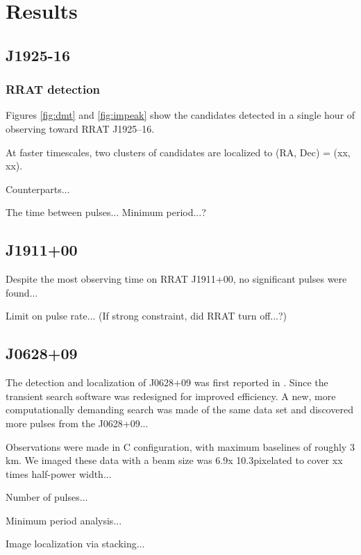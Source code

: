\section{Results}\begin{quote}

\end{quote}

\subsection{J1925-16}
\subsubsection{RRAT detection}
\label{rrat1925}

Figures \ref{fig:dmt} and \ref{fig:impeak} show the candidates detected in a single hour of observing toward RRAT J1925--16. 

At faster timescales, two clusters of candidates are localized to (RA, Dec) = (xx, xx). 

Counterparts...

The time between pulses... Minimum period...?

\subsection{J1911+00}

Despite the most observing time on RRAT J1911+00, no significant pulses were found...

Limit on pulse rate...
(If strong constraint, did RRAT turn off...?)

\subsection{J0628+09}

The detection and localization of J0628+09 was first reported in \cite{Law_2012}. Since the transient search software was redesigned for improved efficiency. A new, more computationally demanding search was made of the same data set and discovered more pulses from the J0628+09...

Observations were made in C configuration, with maximum baselines of roughly 3 km. We imaged these data with a beam size was 6.9\arcsec x 10.3\arcsec pixelated to cover xx times half-power width...

Number of pulses...

Minimum period analysis...

Image localization via stacking...
